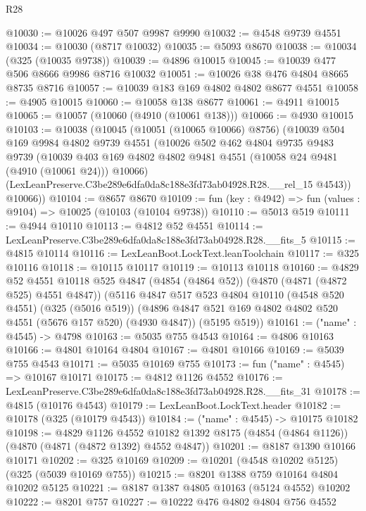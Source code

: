 \begin{lexlean}{R28}
\begin{coremodule}
@10030 := @10026 @497 @507 @9987 @9990
@10032 := @4548 @9739 @4551
@10034 := @10030 (@8717 @10032)
@10035 := @5093 @8670
@10038 := @10034 (@325 (@10035 @9738))
@10039 := @4896 @10015
@10045 := @10039 @477 @506 @8666 @9986 @8716 @10032
@10051 := @10026 @38 @476 @4804 @8665 @8735 @8716
@10057 := @10039 @183 @169 @4802 @4802 @8677 @4551
@10058 := @4905 @10015
@10060 := @10058 @138 @8677
@10061 := @4911 @10015
@10065 := @10057 (@10060 (@4910 (@10061 @138)))
@10066 := @4930 @10015
@10103 := @10038
    (@10045
      (@10051 (@10065 @10066) @8756)
      (@10039
        @504
        @169
        @9984
        @4802
        @9739
        @4551
        (@10026
          @502
          @462
          @4804
          @9735
          @9483
          @9739
          (@10039 @403 @169 @4802 @4802 @9481 @4551 (@10058 @24 @9481 (@4910 (@10061 @24))) @10066)
          (LexLeanPreserve.C3be289e6dfa0da8c188e3fd73ab04928.R28.__rel_15 @4543))
        @10066))
@10104 := @8657 @8670
@10109 := fun (key : @4942) => fun (values : @9104) => @10025 (@10103 (@10104 @9738))
@10110 := @5013 @519
@10111 := @4944 @10110
@10113 := @4812 @52 @4551
@10114 := LexLeanPreserve.C3be289e6dfa0da8c188e3fd73ab04928.R28.__fits_5
@10115 := @4815 @10114
@10116 := LexLeanBoot.LockText.leanToolchain
@10117 := @325 @10116
@10118 := @10115 @10117
@10119 := @10113 @10118
@10160 := @4829
    @52
    @4551
    @10118
    @525
    @4847
    (@4854 (@4864 @52))
    (@4870 (@4871 (@4872 @525) @4551 @4847))
    (@5116
      @4847
      @517
      @523
      @4804
      @10110
      (@4548 @520 @4551)
      (@325 (@5016 @519))
      (@4896 @4847 @521 @169 @4802 @4802 @520 @4551 (@5676 @157 @520) (@4930 @4847))
      (@5195 @519))
@10161 := ("name" : @4545) -> @4798
@10163 := @5035 @755 @4543
@10164 := @4806 @10163
@10166 := @4801 @10164 @4804
@10167 := @4801 @10166
@10169 := @5039 @755 @4543
@10171 := @5035 @10169 @755
@10173 := fun ("name" : @4545) => @10167 @10171
@10175 := @4812 @1126 @4552
@10176 := LexLeanPreserve.C3be289e6dfa0da8c188e3fd73ab04928.R28.__fits_31
@10178 := @4815 (@10176 @4543)
@10179 := LexLeanBoot.LockText.header
@10182 := @10178 (@325 (@10179 @4543))
@10184 := ("name" : @4545) -> @10175 @10182
@10198 := @4829
    @1126
    @4552
    @10182
    @1392
    @8175
    (@4854 (@4864 @1126))
    (@4870 (@4871 (@4872 @1392) @4552 @4847))
@10201 := @8187 @1390 @10166 @10171
@10202 := @325 @10169
@10209 := @10201 (@4548 @10202 @5125) (@325 (@5039 @10169 @755))
@10215 := @8201 @1388 @759 @10164 @4804 @10202 @5125
@10221 := @8187 @1387 @4805 @10163 (@5124 @4552) @10202
@10222 := @8201 @757
@10227 := @10222 @476 @4802 @4804 @756 @4552

\end{coremodule}
\end{lexlean}
